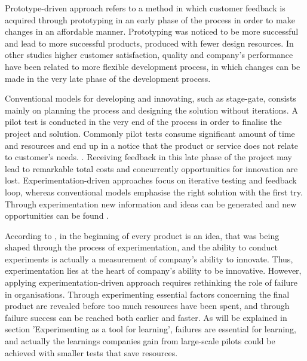 Prototype-driven approach refers to a method in which customer feedback is acquired through prototyping in an early phase of the process in order to make changes in an affordable manner.
Prototyping was noticed to be more successful and lead to more successful products, produced with fewer design resources. In other studies higher customer satisfaction, quality and company's performance have been related to more flexible development process, in which changes can be made in the very late phase of the development process. \citep{thomke1998agile}

Conventional models for developing and innovating, such as stage-gate, consists mainly on planning the process and designing the solution without iterations. A pilot test is conducted in the very end of the process in order to finalise the project and solution. Commonly pilot tests consume significant amount of time and resources and end up in a notice that the product or service does not relate to customer's needs. \citep{schrage1993culture}. Receiving feedback in this late phase of the project may lead to remarkable total costs and concurrently opportunities for innovation are lost. Experimentation-driven approaches focus on iterative testing and feedback loop, whereas conventional models emphasise the right solution with the first try. \citep{thomke2003r} Through experimentation new information and ideas can be generated and new opportunities can be found \citep{tuulenmaki2011art, mcgrath2010business}. 

According to \citet{thomke2001enlightened}, in the beginning of every product is an idea, that was being shaped through the process of experimentation, and the ability to conduct experiments is actually a measurement of company's ability to innovate. Thus, experimentation lies at the heart of company's ability to be innovative. However, applying experimentation-driven approach requires rethinking the role of failure in organisations. Through experimenting essential factors concerning the final product are revealed before too much resources have been spent, and through failure success can be reached both earlier and faster. \citep{thomke2003r} As will be explained in section 'Experimenting as a tool for learning', failures are essential for learning, and actually the learnings companies gain from large-scale pilots could be achieved with smaller tests that save resources. \citep{anderson2011step}

